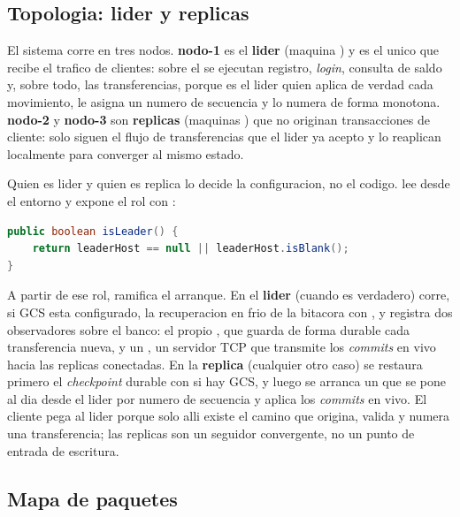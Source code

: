 \subsection{Topologia: lider y replicas}

El sistema corre en tres nodos. \textbf{nodo-1} es el \textbf{lider}
(maquina ) y es el unico que recibe el trafico de clientes:
sobre el se ejecutan registro, \emph{login}, consulta de saldo y, sobre todo, las
transferencias, porque es el lider quien aplica de verdad cada movimiento, le
asigna un numero de secuencia y lo numera de forma monotona. \textbf{nodo-2} y
\textbf{nodo-3} son \textbf{replicas} (maquinas ) que no
originan transacciones de cliente: solo siguen el flujo de transferencias que el
lider ya acepto y lo reaplican localmente para converger al mismo estado.

Quien es lider y quien es replica lo decide la configuracion, no el codigo.
 lee  desde el entorno y
expone el rol con :

\begin{lstlisting}[language=Java,caption={NodeConfig.isLeader: el rol se infiere de TES\_LEADER\_HOST}]
public boolean isLeader() {
    return leaderHost == null || leaderHost.isBlank();
}
\end{lstlisting}

A partir de ese rol,  ramifica el arranque. En el \textbf{lider}
(cuando  es verdadero) corre, si GCS esta configurado,
la recuperacion en frio de la bitacora con , y
registra dos observadores sobre el banco: el propio , que guarda
de forma durable cada transferencia nueva, y un ,
un servidor TCP que transmite los \emph{commits} en vivo hacia las replicas
conectadas. En la \textbf{replica} (cualquier otro caso) se restaura primero el
\emph{checkpoint} durable con  si hay GCS, y
luego se arranca un  que se pone al dia desde el
lider por numero de secuencia y aplica los \emph{commits} en vivo. El cliente pega
al lider porque solo alli existe el camino que origina, valida y numera una
transferencia; las replicas son un seguidor convergente, no un punto de entrada de
escritura.

\subsection{Mapa de paquetes}

